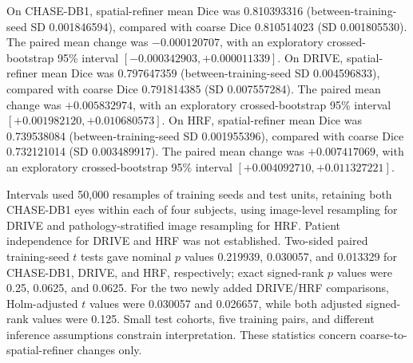 \documentclass[jimaging,article,submit,pdftex,moreauthors]{Definitions/mdpi}%
\begin{document}
\begin{table}[htbp]
\centering
\caption{Contextual Dice summary of the additional spatial-refiner experiment and the supplied diffusion evaluation table. The coarse and spatial-refiner columns are paired within the new experiment; the diffusion column is from the separate author-supplied table at 50 transitions. This is not a controlled paired spatial-refiner--diffusion benchmark. Coarse and spatial-refiner means are rounded to six decimals; the diffusion means retain the supplied computed decimal values. The number of displayed digits does not imply corresponding measurement precision.}
\label{tab:spatial_refiner_context}
\small
{}
\end{table}



On CHASE-DB1, spatial-refiner mean Dice was 0.810393316 (between-training-seed SD 0.001846594), compared with coarse Dice 0.810514023 (SD 0.001805530). The paired mean change was $-0.000120707$, with an exploratory crossed-bootstrap 95\% interval $[-0.000342903, +0.000011339]$. On DRIVE, spatial-refiner mean Dice was 0.797647359 (between-training-seed SD 0.004596833), compared with coarse Dice 0.791814385 (SD 0.007557284). The paired mean change was $+0.005832974$, with an exploratory crossed-bootstrap 95\% interval $[+0.001982120, +0.010680573]$. On HRF, spatial-refiner mean Dice was 0.739538084 (between-training-seed SD 0.001955396), compared with coarse Dice 0.732121014 (SD 0.003489917). The paired mean change was $+0.007417069$, with an exploratory crossed-bootstrap 95\% interval $[+0.004092710, +0.011327221]$. 



Intervals used 50,000 resamples of training seeds and test units, retaining both CHASE-DB1 eyes within each of four subjects, using image-level resampling for DRIVE and pathology-stratified image resampling for HRF. Patient independence for DRIVE and HRF was not established. Two-sided paired training-seed $t$ tests gave nominal $p$ values 0.219939, 0.030057, and 0.013329 for CHASE-DB1, DRIVE, and HRF, respectively; exact signed-rank $p$ values were 0.25, 0.0625, and 0.0625. For the two newly added DRIVE/HRF comparisons, Holm-adjusted $t$ values were 0.030057 and 0.026657, while both adjusted signed-rank values were 0.125. Small test cohorts, five training pairs, and different inference assumptions constrain interpretation. These statistics concern coarse-to-spatial-refiner changes only.
\end{document}
